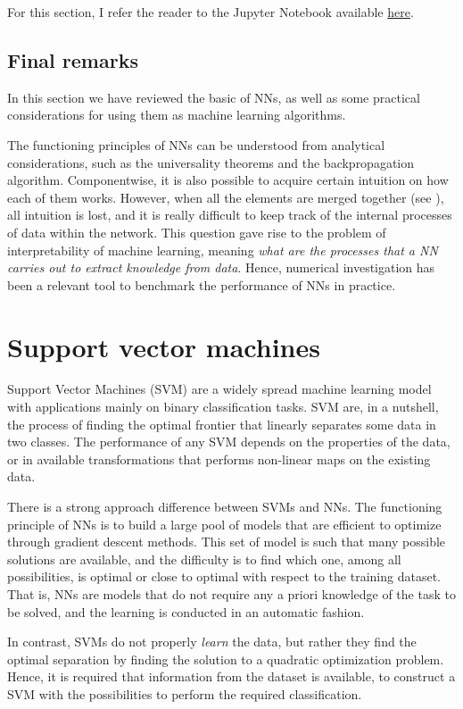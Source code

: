 \documentclass[]{report}
\begin{document}
For this section, I refer the reader to the Jupyter Notebook available \href{}{here}.

\subsection{Final remarks}

In this section we have reviewed the basic of NNs, as well as some practical considerations for using them as machine learning algorithms. 

The functioning principles of NNs can be understood from analytical considerations, such as the universality theorems and the backpropagation algorithm. Componentwise, it is also possible to acquire certain intuition on how each of them works. However, when all the elements are merged together (see ), all intuition is lost, and it is really difficult to keep track of the internal processes of data within the network. This question gave rise to the problem of interpretability of machine learning, meaning \textit{what are the processes that a NN carries out to extract knowledge from data}. 
Hence, numerical investigation has been a relevant tool to benchmark the performance of NNs in practice. 

\section{Support vector machines}\label{sec.support-vector-machines}

Support Vector Machines (SVM) are a widely spread machine learning model with applications mainly on binary classification tasks. SVM are, in a nutshell, the process of finding the optimal frontier that linearly separates some data in two classes. The performance of any SVM depends on the properties of the data, or in available transformations that performs non-linear maps on the existing data. 

There is a strong approach difference between SVMs and NNs. The functioning principle of NNs is to build a large pool of models that are efficient to optimize through gradient descent methods. This set of model is such that many possible solutions are available, and the difficulty is to find which one, among all possibilities, is optimal or close to optimal with respect to the training dataset. That is, NNs are models that do not require any a priori knowledge of the task to be solved, and the learning is conducted in an automatic fashion. 

In contrast, SVMs do not properly \textit{learn} the data, but rather they find the optimal separation by finding the solution to a quadratic optimization problem. Hence, it is required that information from the dataset is available, to construct a SVM with the possibilities to perform the required classification. 
\end{document}
